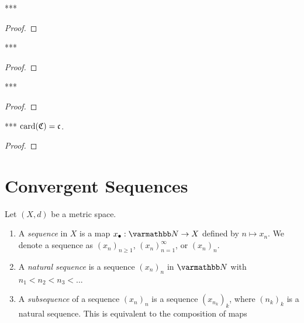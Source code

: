     \begin{lemma}***
        
    \end{lemma}
        \begin{proof}
            
        \end{proof}

    \begin{lemma}***
    
    \end{lemma}
        \begin{proof}
            
        \end{proof}

    \begin{lemma}***

    \end{lemma}
        \begin{proof}
            
        \end{proof}

    \begin{proposition}***
        $\operatorname{card}(\mathfrak{C}) = \mathfrak{c}$.
    \end{proposition}
        \begin{proof}
            
        \end{proof}

\section{Convergent Sequences}\label{sec:conv-seq}
    \begin{definition}
        Let $(X,d)$ be a metric space.
        \begin{enumerate}[label = (\arabic*),itemsep=1pt,topsep=3pt]
            \item A \textit{sequence} in $X$ is a map $x_{\bullet}:\bfN \rightarrow X$ defined by $n \mapsto x_n$. We denote a sequence as $(x_n)_{n \geq 1}$, $(x_n)_{n = 1}^\infty$, or $(x_n)_n$.
            
            \item A \textit{natural sequence} is a sequence $(x_n)_n$ in $\bfN$ with $n_1 < n_2 < n_3 < ...$
            
            \item A \textit{subsequence} of a sequence $(x_n)_n$ is a sequence $(x_{n_k})_k$, where $(n_k)_k$ is a natural sequence. This is equivalent to the composition of maps
        \end{enumerate}
    \end{definition}


